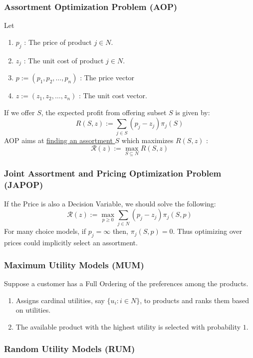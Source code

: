 \documentclass[11pt,a4paper]{article}
\begin{document}
\subsubsection{Assortment Optimization Problem (AOP)}
Let
\begin{enumerate}[$\bullet$]
    \item $p_{j}$ : The price of product $j \in N$.
    \item $z_{j}$ : The unit cost of product $j \in N$.
    \item $p:=\left(p_{1}, p_{2}, \ldots, p_{n}\right)$ : The price vector
    \item $z:=\left(z_{1}, z_{2}, \ldots, z_{n}\right)$ : The unit cost vector.
\end{enumerate}
If we offer $S$, the expected profit from offering subset $S$ is given by:
$$
R(S, z):=\sum_{j \in S}\left(p_{j}-z_{j}\right) \pi_{j}(S)
$$
AOP aims at \underline{finding an assortment $S$} which maximizes $R(S, z)$ :
$$
\mathcal{R}(z):=\max _{S \subseteq N} R(S, z)
$$

\subsubsection{Joint Assortment and Pricing Optimization Problem (JAPOP)}
If the Price is also a Decision Variable, we should solve the following:
$$
\mathcal{R}(z):=\max _{p \geq 0} \sum_{j \in N}\left(p_{j}-z_{j}\right) \pi_{j}(S, p)
$$
For many choice models, if $p_{j}=\infty$ then, $\pi_{j}(S, p)=0$. Thus optimizing over prices could implicitly select an assortment.

\subsubsection{Maximum Utility Models (MUM)}
Suppose a customer has a Full Ordering of the preferences among the products.
\begin{enumerate}[$\bullet$]
    \item Assigns cardinal utilities, say $\{u_i : i \in N\}$, to products and ranks them based on utilities.
    \item The available product with the highest utility is selected with probability $1$.
\end{enumerate}

\subsubsection{Random Utility Models (RUM)}
\begin{center}
\end{center}
\end{document}
